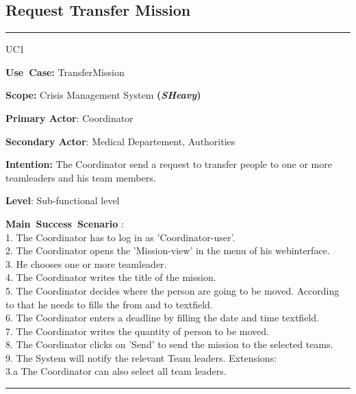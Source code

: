 \subsection{Request Transfer Mission}
\vspace{0.5cm}
\hrule
\vspace{0.5cm}
\begin{lyxlist}{UC1}
\small{
\item [\textbf{Use~Case:}] TransferMission
\item [\textbf{Scope:}] Crisis Management System \textbf{(\emph{SHeavy})}
\item [\textbf{Primary Actor}:] Coordinator
\item [\textbf{Secondary Actor}:] Medical Departement, Authorities
\item [\textbf{Intention:}]The Coordinator send a request to transfer people
to one or more teamleaders and his team members.
\item [\textbf{Level}:]Sub-functional level
\item [\textbf{Main~Success~Scenario}]:\\
1. The Coordinator has to log in as 'Coordinator-user'.\\
2. The Coordinator opens the 'Mission-view' in the menu of his webinterface.\\
3. He chooses one or more teamleader.\\
4. The Coordinator writes the title of the mission.\\
5. The Coordinator decides where the person are going to be moved. According to
that he needs to fills the from and to textfield.\\
6. The Coordinator enters a deadline by filling the date and time textfield.\\
7. The Coordinator writes the quantity of person to be moved.\\
8. The Coordinator clicks on 'Send' to send the mission to the selected
teams.\\
9. The System will notify the relevant Team leaders.
Extensions:\\
	3.a The Coordinator can also select all team leaders.\\
}
\end{lyxlist}
\hrule 
\vspace{0.5cm} 

